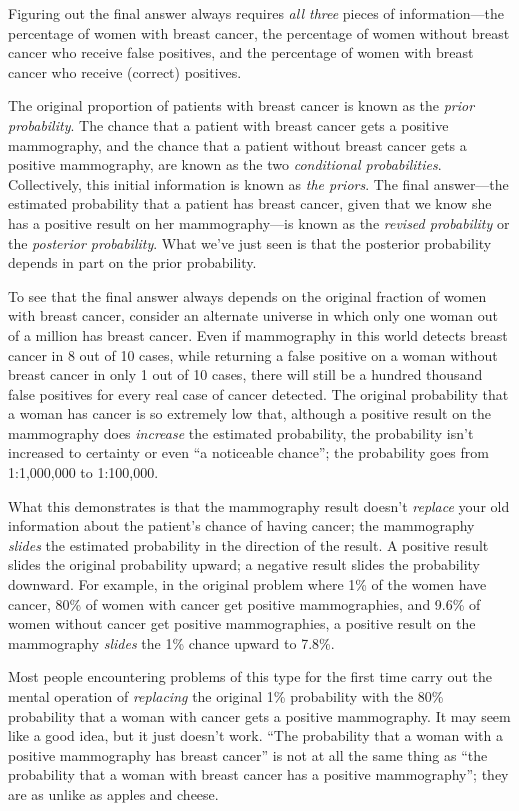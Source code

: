 {
 Figuring out the final answer always requires \textit{all three}
pieces of information---the percentage of women with breast cancer, the
percentage of women without breast cancer who receive false positives,
and the percentage of women with breast cancer who receive (correct)
positives.}

{
 The original proportion of patients with breast cancer is known as
the \textit{prior probability}. The chance that a patient with breast
cancer gets a positive mammography, and the chance that a patient
without breast cancer gets a positive mammography, are known as the two
\textit{conditional probabilities}. Collectively, this initial
information is known as \textit{the priors}. The final answer---the
estimated probability that a patient has breast cancer, given that we
know she has a positive result on her mammography---is known as the
\textit{revised probability} or the \textit{posterior probability}.
What we've just seen is that the posterior probability
depends in part on the prior probability.}

{
 To see that the final answer always depends on the original
fraction of women with breast cancer, consider an alternate universe in
which only one woman out of a million has breast cancer. Even if
mammography in this world detects breast cancer in 8 out of 10 cases,
while returning a false positive on a woman without breast cancer in
only 1 out of 10 cases, there will still be a hundred thousand false
positives for every real case of cancer detected. The original
probability that a woman has cancer is so extremely low that, although
a positive result on the mammography does \textit{increase} the
estimated probability, the probability isn't increased
to certainty or even ``a noticeable
chance''; the probability goes from 1:1,000,000 to
1:100,000.}

{
 What this demonstrates is that the mammography result
doesn't \textit{replace} your old information about the
patient's chance of having cancer; the mammography
\textit{slides} the estimated probability in the direction of the
result. A positive result slides the original probability upward; a
negative result slides the probability downward. For example, in the
original problem where 1\% of the women have cancer, 80\% of women with
cancer get positive mammographies, and 9.6\% of women without cancer
get positive mammographies, a positive result on the mammography
\textit{slides} the 1\% chance upward to 7.8\%.}

{
 Most people encountering problems of this type for the first time
carry out the mental operation of \textit{replacing} the original 1\%
probability with the 80\% probability that a woman with cancer gets a
positive mammography. It may seem like a good idea, but it just
doesn't work. ``The probability that a
woman with a positive mammography has breast cancer''
is not at all the same thing as ``the probability that
a woman with breast cancer has a positive
mammography''; they are as unlike as apples and
cheese.}

